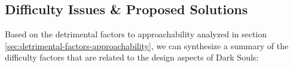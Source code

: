 \subsection{Difficulty Issues \& Proposed Solutions}


Based on the detrimental factors to approachability analyzed in section \ref{sec:detrimental-factors-approachability}, we can synthesize a summary of the difficulty factors that are related to the design aspects of Dark Souls:

